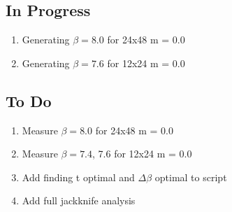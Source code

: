 \documentclass[11pt]{article}
\begin{document}
\subsection{In Progress} 
\begin{enumerate}
  \item Generating $\beta=8.0$ for 24x48 m = 0.0
  \item Generating $\beta=7.6$ for 12x24 m = 0.0
\end{enumerate}

\subsection{To Do}

\begin{enumerate}
  \item Measure $\beta=8.0$ for 24x48 m = 0.0
  \item Measure $\beta=7.4$, 7.6 for 12x24 m = 0.0
  \item Add finding t optimal and $\Delta\beta$ optimal to script
  \item Add full jackknife analysis
\end{enumerate}
\end{document}
